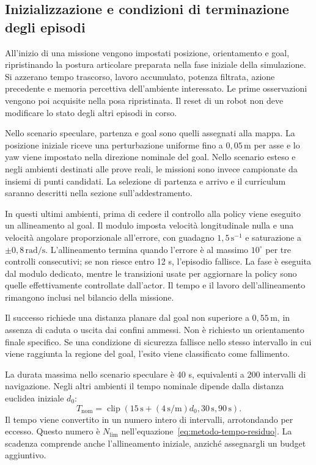 \subsection{Inizializzazione e condizioni di terminazione degli episodi}

All'inizio di una missione vengono impostati posizione, orientamento e goal, ripristinando la postura articolare preparata nella fase iniziale della simulazione. Si azzerano tempo trascorso, lavoro accumulato, potenza filtrata, azione precedente e memoria percettiva dell'ambiente interessato. Le prime osservazioni vengono poi acquisite nella posa ripristinata. Il reset di un robot non deve modificare lo stato degli altri episodi in corso.

Nello scenario speculare, partenza e goal sono quelli assegnati alla mappa. La posizione iniziale riceve una perturbazione uniforme fino a $0{,}05\,\mathrm{m}$ per asse e lo yaw viene impostato nella direzione nominale del goal. Nello scenario esteso e negli ambienti destinati alle prove reali, le missioni sono invece campionate da insiemi di punti candidati. La selezione di partenza e arrivo e il curriculum saranno descritti nella sezione sull'addestramento.

In questi ultimi ambienti, prima di cedere il controllo alla policy viene eseguito un allineamento al goal. Il modulo imposta velocità longitudinale nulla e una velocità angolare proporzionale all'errore, con guadagno $1{,}5\,\mathrm{s}^{-1}$ e saturazione a $\pm0{,}8\,\mathrm{rad/s}$. L'allineamento termina quando l'errore è al massimo $10^\circ$ per tre controlli consecutivi; se non riesce entro 12 s, l'episodio fallisce. La fase è eseguita dal modulo dedicato, mentre le transizioni usate per aggiornare la policy sono quelle effettivamente controllate dall'actor. Il tempo e il lavoro dell'allineamento rimangono inclusi nel bilancio della missione.

Il successo richiede una distanza planare dal goal non superiore a $0{,}55\,\mathrm{m}$, in assenza di caduta o uscita dai confini ammessi. Non è richiesto un orientamento finale specifico. Se una condizione di sicurezza fallisce nello stesso intervallo in cui viene raggiunta la regione del goal, l'esito viene classificato come fallimento.

La durata massima nello scenario speculare è 40 s, equivalenti a 200 intervalli di navigazione. Negli altri ambienti il tempo nominale dipende dalla distanza euclidea iniziale $d_0$:
\begin{equation}
    T_{\mathrm{nom}}=\operatorname{clip}
       \left(15\,\mathrm{s}+(4\,\mathrm{s/m})d_0,
                       30\,\mathrm{s},90\,\mathrm{s}\right).
    \label{eq:metodo-scadenza-missione}
\end{equation}
Il tempo viene convertito in un numero intero di intervalli, arrotondando per eccesso. Questo numero è $N_{\mathrm{lim}}$ nell'equazione~\eqref{eq:metodo-tempo-residuo}. La scadenza comprende anche l'allineamento iniziale, anziché assegnargli un budget aggiuntivo.


